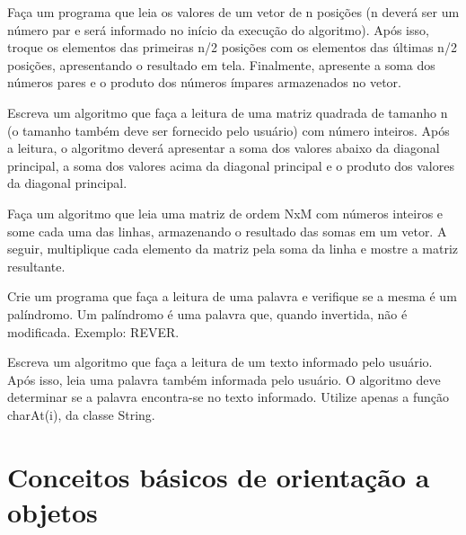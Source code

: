 \begin{exercise}[TrocaVetores]
Faça um programa que leia os valores de um vetor de n posições (n deverá ser um número par e será informado no início da execução do algoritmo). Após isso, troque os elementos das primeiras n/2 posições com os elementos das últimas n/2 posições, apresentando o resultado em tela. Finalmente, apresente a soma dos números pares e o produto dos números ímpares armazenados no vetor.
\end{exercise}

\begin{exercise}[OperacoesMatriz]
Escreva um algoritmo que faça a leitura de uma matriz quadrada de tamanho n (o tamanho também deve ser fornecido pelo usuário) com número inteiros. Após a leitura, o algoritmo deverá apresentar a soma dos valores abaixo da diagonal principal, a soma dos valores acima da diagonal principal e o produto dos valores da diagonal principal.
\end{exercise}

\begin{exercise}[GeraMatriz]
Faça um algoritmo que leia uma matriz de ordem NxM com números inteiros e some cada uma das linhas, armazenando o resultado das somas em um vetor. A seguir, multiplique cada elemento da matriz pela soma da linha e mostre a matriz resultante.
\end{exercise}

\begin{exercise}[Palindromo]
Crie um programa que faça a leitura de uma palavra e verifique se a mesma é um palíndromo. Um palíndromo é uma palavra que, quando invertida, não é modificada. Exemplo: REVER.
\end{exercise}

\begin{exercise}[BuscaPalavra]
Escreva um algoritmo que faça a leitura de um texto informado pelo usuário. Após isso, leia uma palavra também informada pelo usuário. O algoritmo deve determinar se a palavra encontra-se no texto informado. Utilize apenas a função charAt(i), da classe String.
\end{exercise}

\clearpage

\section{Conceitos básicos de orientação a objetos}

